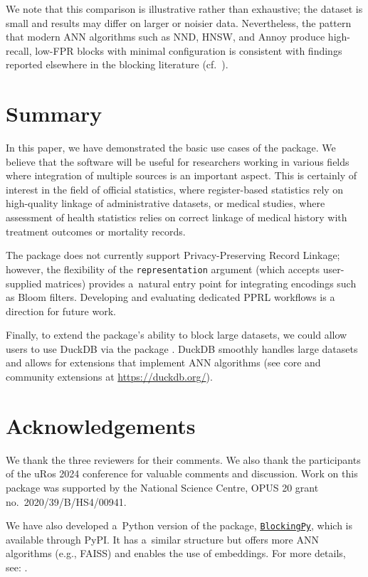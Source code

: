 We note that this comparison is illustrative rather than exhaustive; the dataset is small and results may differ on larger or noisier data. Nevertheless, the pattern that modern ANN algorithms such as NND, HNSW, and Annoy produce high-recall, low-FPR blocks with minimal configuration is consistent with findings reported elsewhere in the blocking literature (cf.~\citet{Papadakis2020}).

\section{Summary}\label{summary}

In this paper, we have demonstrated the basic use cases of the
 package. We believe that the software will be useful
for researchers working in various fields where integration of multiple
sources is an important aspect. This is certainly of interest in the
field of official statistics, where register-based statistics rely on
high-quality linkage of administrative datasets, or medical studies,
where assessment of health statistics relies on correct linkage of
medical history with treatment outcomes or mortality records.

The package does not currently support Privacy-Preserving Record Linkage; however,
the flexibility of the \texttt{representation} argument (which accepts user-supplied matrices) provides
a~natural entry point for integrating encodings such as Bloom filters.
Developing and evaluating dedicated PPRL workflows is a direction for future work.

Finally, to extend the package's ability to block large datasets, we could allow users to use DuckDB \citep{raasveldt2019duckdb} via the  package \citep{duckdb}. DuckDB smoothly handles large datasets and allows for extensions that implement ANN algorithms (see core and community extensions at \url{https://duckdb.org/}).

\section{Acknowledgements}\label{acknowledgements}

We thank the three reviewers for their comments. We also thank the participants of the uRos 2024 conference for valuable comments and discussion. Work on this package was supported by the National Science Centre, OPUS 20 grant no.~2020/39/B/HS4/00941.

We have also developed a~Python version of the package,
\href{https://blockingpy.readthedocs.io/en/latest/}{\texttt{BlockingPy}}, which is
available through PyPI. It has a~similar structure but offers more ANN
algorithms (e.g., FAISS) and enables the use of embeddings. For more
details, see: \citet{Strojny2026}.

